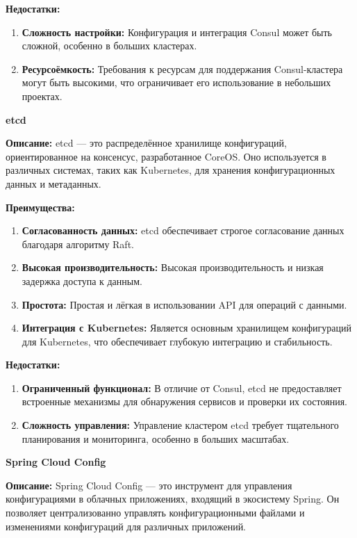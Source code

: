 \textbf{Недостатки:}
\begin{enumerate}[label=\arabic*.]
    \item \textbf{Сложность настройки:} Конфигурация и интеграция Consul может быть сложной, особенно в больших кластерах.
    \item \textbf{Ресурсоёмкость:} Требования к ресурсам для поддержания Consul-кластера могут быть высокими, что ограничивает его использование в небольших проектах.
\end{enumerate}


\textbf{etcd}

\textbf{Описание:} etcd — это распределённое хранилище конфигураций, ориентированное на консенсус, разработанное CoreOS. Оно используется в различных системах, таких как Kubernetes, для хранения конфигурационных данных и метаданных.

\textbf{Преимущества:}
\begin{enumerate}[label=\arabic*.]
    \item \textbf{Согласованность данных:} etcd обеспечивает строгое согласование данных благодаря алгоритму Raft.
    \item \textbf{Высокая производительность:} Высокая производительность и низкая задержка доступа к данным.
    \item \textbf{Простота:} Простая и лёгкая в использовании API для операций с данными.
    \item \textbf{Интеграция с Kubernetes:} Является основным хранилищем конфигураций для Kubernetes, что обеспечивает глубокую интеграцию и стабильность.
\end{enumerate}

\textbf{Недостатки:}
\begin{enumerate}[label=\arabic*.]
    \item \textbf{Ограниченный функционал:} В отличие от Consul, etcd не предоставляет встроенные механизмы для обнаружения сервисов и проверки их состояния.
    \item \textbf{Сложность управления:} Управление кластером etcd требует тщательного планирования и мониторинга, особенно в больших масштабах.
\end{enumerate}

\textbf{Spring Cloud Config}

\textbf{Описание:} Spring Cloud Config — это инструмент для управления конфигурациями в облачных приложениях, входящий в экосистему Spring.
Он позволяет централизованно управлять конфигурационными файлами и изменениями конфигураций для различных приложений.

